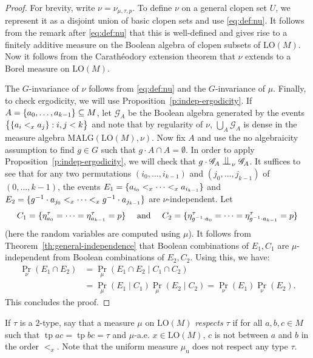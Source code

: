 \documentclass[JEP,XML,SOM,Unicode,published]{cedram}
\let\mathcal\mathscr
\let\sub\subseteq
\theoremstyle{plain}
\theoremstyle{definition}
\newcommand{\cG}{\mathcal{G}}
\DeclareMathOperator{\tp}{tp}
\DeclarePairedDelimiter\set{\{}{\}}
\newcommand{\LO}{\mathrm{LO}}
\newcommand{\MALG}{\mathrm{MALG}}
\newcommand{\muu}{\mu_{\mathrm{u}}}
\renewcommand{\And}{\text{ and }}
\newcommand{\indep}[1][]{%
  \mathrel{
    \mathop{
      \scalebox{1}[1.3]{\text{$\perp\!\!\!\perp$}}
    }\displaylimits_{#1}
  }
}
\begin{document}
\begin{proof}
For brevity, write $\nu = \nu_{\mu, \tau, p}$. To define $\nu$ on a general clopen set $U$, we represent it as a disjoint union of basic clopen sets and use \eqref{eq:def:nu}. It follows from the remark after \eqref{eq:def:nu} that this is well-defined and gives rise to a finitely additive measure on the Boolean algebra of clopen subsets of $\LO(M)$. Now it follows from the Carathéodory extension theorem that $\nu$ extends to a Borel measure on $\LO(M)$.

The $G$-invariance of $\nu$ follows from \eqref{eq:def:nu} and the $G$-invariance of $\mu$. Finally, to check ergodicity, we will use Proposition~\ref{p:indep-ergodicity}. If $A = \set{a_0, \ldots, a_{k-1}} \sub M$, let $\cG_A$ be the Boolean algebra generated by the events $\set[\big]{\set{a_i <_x a_j} : i, j < k}$ and note that by regularity of $\nu$, $\bigcup_A \cG_A$ is dense in the measure algebra $\MALG(\LO(M), \nu)$. Now fix $A$ and use the no algebraicity assumption to find $g \in G$ such that $g \cdot A \cap A = \emptyset$. In order to apply Proposition~\ref{p:indep-ergodicity}, we will check that $g \cdot \cG_A \indep_\nu \cG_A$. It suffices to see that for any two permutations $(i_0, \ldots, i_{k-1})$ and $(j_0, \ldots, j_{k-1})$ of $(0, \ldots, k-1)$, the events $E_1 = \set{a_{i_0} <_x \cdots <_x a_{i_{k-1}}}$ and $E_2 = \set{g^{-1} \cdot a_{j_0} <_x \cdots <_x g^{-1} \cdot a_{j_{k-1}}}$ are $\nu$-independent. Let\vspace*{-3pt}
\[
C_1 = \set{\eta_{a_0}^\tau = \cdots = \eta_{a_{k-1}}^\tau = p} \quad\And\quad C_2 = \set{\eta_{g^{-1} \cdot a_0}^\tau = \cdots = \eta_{g^{-1} \cdot a_{k-1}}^\tau = p}
\]
(here the random variables are computed using $\mu$). It follows from Theorem~\ref{th:general-independence} that Boolean combinations of $E_1, C_1$ are $\mu$-independent from Boolean combinations of $E_2, C_2$. Using this, we have:
\begin{equation*}
\begin{split}
\Pr_\nu(E_1 \cap E_2) &= \Pr_\mu(E_1 \cap E_2 \mid C_1 \cap C_2) \\
&= \Pr_\mu(E_1 \mid C_1) \Pr_\mu(E_2 \mid C_2) = \Pr_\nu(E_1) \Pr_\nu(E_2).
\end{split}
\end{equation*}
This concludes the proof.
\end{proof}

If $\tau$ is a $2$-type, say that a measure $\mu$ on $\LO(M)$ \emph{respects $\tau$} if for all $a, b, c \in M$ such that $\tp ac = \tp bc = \tau$ and $\mu$-a.e. $x \in \LO(M)$, $c$ is not between $a$ and $b$ in the order $<_x$. Note that the uniform measure $\muu$ does not respect any type $\tau$.
\end{document}
